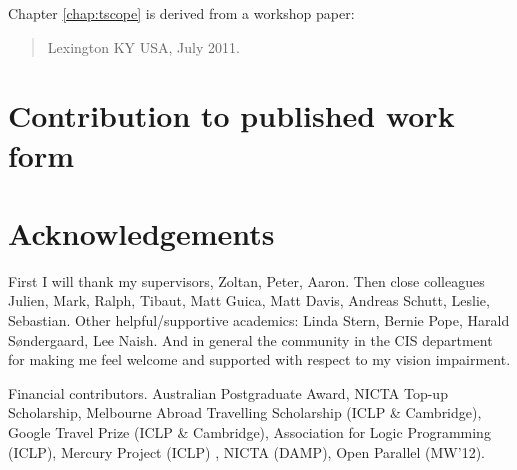 \documentclass[a4paper,twoside]{report}
\begin{document}
\begin{quote}
\end{quote}


Chapter \ref{chap:tscope} is derived from a workshop paper:

\begin{quote}
{Lexington KY USA, July 2011.}
\end{quote}


\chapter*{Contribution to published work form}


\chapter*{Acknowledgements}


First I will thank my supervisors,
Zoltan,
Peter,
Aaron.
Then close colleagues
Julien, 
Mark, 
Ralph, 
Tibaut,
Matt Guica,
Matt Davis,
Andreas Schutt,
Leslie,
Sebastian.
Other helpful/supportive academics:
Linda Stern,
Bernie Pope,
Harald S{\o}ndergaard,
Lee Naish.
And in general the community in the CIS department for making me feel
welcome and supported with respect to my vision impairment.

Financial contributors.
Australian Postgraduate Award,
NICTA Top-up Scholarship,
Melbourne Abroad Travelling Scholarship (ICLP \& Cambridge),
Google Travel Prize (ICLP \& Cambridge),
Association for Logic Programming (ICLP),
Mercury Project (ICLP) ,
NICTA (DAMP),
Open Parallel (MW'12).
\end{document}

